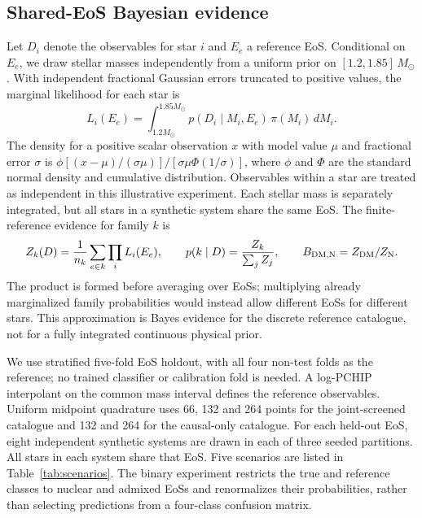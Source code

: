 \documentclass[11pt,a4paper]{article}
\newcommand{\Msun}{M_\odot}
\begin{document}
\subsection{Shared-EoS Bayesian evidence}\label{sec:evidence}
Let $D_i$ denote the observables for star $i$ and $E_e$ a reference EoS. Conditional on $E_e$, we draw stellar masses independently from a uniform prior on $[1.2,1.85]\,\Msun$. With independent fractional Gaussian errors truncated to positive values, the marginal likelihood for each star is
\begin{equation}
 L_i(E_e)=\int_{1.2\Msun}^{1.85\Msun}p(D_i\mid M_i,E_e)\,\pi(M_i)\,dM_i.
\end{equation}
The density for a positive scalar observation $x$ with model value $\mu$ and fractional error $\sigma$ is $\phi[(x-\mu)/(\sigma\mu)]/[\sigma\mu\Phi(1/\sigma)]$, where $\phi$ and $\Phi$ are the standard normal density and cumulative distribution. Observables within a star are treated as independent in this illustrative experiment. Each stellar mass is separately integrated, but all stars in a synthetic system share the same EoS. The finite-reference evidence for family $k$ is
\begin{equation}
 Z_k(D)=\frac{1}{n_k}\sum_{e\in k}\prod_i L_i(E_e),\qquad
 p(k\mid D)=\frac{Z_k}{\sum_j Z_j},\qquad B_{\rm DM,N}=Z_{\rm DM}/Z_{\rm N}.
\end{equation}
The product is formed before averaging over EoSs; multiplying already marginalized family probabilities would instead allow different EoSs for different stars. This approximation is Bayes evidence for the discrete reference catalogue, not for a fully integrated continuous physical prior.

We use stratified five-fold EoS holdout, with all four non-test folds as the reference; no trained classifier or calibration fold is needed. A log-PCHIP interpolant on the common mass interval defines the reference observables. Uniform midpoint quadrature uses 66, 132 and 264 points for the joint-screened catalogue and 132 and 264 for the causal-only catalogue. For each held-out EoS, eight independent synthetic systems are drawn in each of three seeded partitions. All stars in each system share that EoS. Five scenarios are listed in Table~\ref{tab:scenarios}. The binary experiment restricts the true and reference classes to nuclear and admixed EoSs and renormalizes their probabilities, rather than selecting predictions from a four-class confusion matrix.
\end{document}
